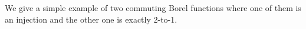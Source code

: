 \documentclass[11pt, reqno, a4paper]{amsart}
\theoremstyle{definition}
\theoremstyle{plain}
\begin{document}




We give a simple example of two commuting Borel functions where one of them is an injection and the other one is exactly 2-to-1.
\end{document}
